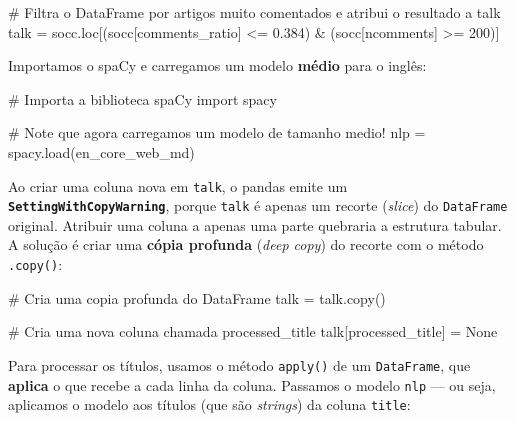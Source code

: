 \documentclass[
  brazilian,
  11pt,
]{article}
\newenvironment{Shaded}{\begin{snugshade}}{\end{snugshade}}
\newcommand{\CommentTok}[1]{\textcolor[rgb]{0.48,0.49,0.49}{#1}}
\newcommand{\DecValTok}[1]{\textcolor[rgb]{0.96,0.45,0.00}{#1}}
\newcommand{\FloatTok}[1]{\textcolor[rgb]{0.96,0.45,0.00}{#1}}
\newcommand{\ImportTok}[1]{\textcolor[rgb]{0.15,0.68,0.38}{#1}}
\newcommand{\NormalTok}[1]{\textcolor[rgb]{0.81,0.81,0.76}{#1}}
\newcommand{\OperatorTok}[1]{\textcolor[rgb]{0.81,0.81,0.76}{#1}}
\newcommand{\StringTok}[1]{\textcolor[rgb]{0.96,0.31,0.31}{#1}}
\newcommand{\VariableTok}[1]{\textcolor[rgb]{0.15,0.68,0.68}{#1}}
\let\oldtexttt\texttt
\renewcommand{\texttt}[1]{{\color{inlink}\oldtexttt{#1}}}
\begin{document}
\begin{Shaded}
\begin{Highlighting}[]
\CommentTok{\# Filtra o DataFrame por artigos muito comentados e atribui o resultado a \textquotesingle{}talk\textquotesingle{}}
\NormalTok{talk }\OperatorTok{=}\NormalTok{ socc.loc[(socc[}\StringTok{\textquotesingle{}comments\_ratio\textquotesingle{}}\NormalTok{] }\OperatorTok{\textless{}=} \FloatTok{0.384}\NormalTok{) }\OperatorTok{\&}\NormalTok{ (socc[}\StringTok{\textquotesingle{}ncomments\textquotesingle{}}\NormalTok{] }\OperatorTok{\textgreater{}=} \DecValTok{200}\NormalTok{)]}
\end{Highlighting}
\end{Shaded}

Importamos o spaCy e carregamos um modelo \textbf{médio} para o inglês:

\begin{Shaded}
\begin{Highlighting}[]
\CommentTok{\# Importa a biblioteca spaCy}
\ImportTok{import}\NormalTok{ spacy}

\CommentTok{\# Note que agora carregamos um modelo de tamanho medio!}
\NormalTok{nlp }\OperatorTok{=}\NormalTok{ spacy.load(}\StringTok{\textquotesingle{}en\_core\_web\_md\textquotesingle{}}\NormalTok{)}
\end{Highlighting}
\end{Shaded}

Ao criar uma coluna nova em \texttt{talk}, o pandas emite um
\textbf{\texttt{SettingWithCopyWarning}}, porque \texttt{talk} é apenas
um recorte (\emph{slice}) do \texttt{DataFrame} original. Atribuir uma
coluna a apenas uma parte quebraria a estrutura tabular. A solução é
criar uma \textbf{cópia profunda} (\emph{deep copy}) do recorte com o
método \texttt{.copy()}:

\begin{Shaded}
\begin{Highlighting}[]
\CommentTok{\# Cria uma copia profunda do DataFrame}
\NormalTok{talk }\OperatorTok{=}\NormalTok{ talk.copy()}

\CommentTok{\# Cria uma nova coluna chamada \textquotesingle{}processed\_title\textquotesingle{}}
\NormalTok{talk[}\StringTok{\textquotesingle{}processed\_title\textquotesingle{}}\NormalTok{] }\OperatorTok{=} \VariableTok{None}
\end{Highlighting}
\end{Shaded}

Para processar os títulos, usamos o método \texttt{apply()} de um
\texttt{DataFrame}, que \textbf{aplica} o que recebe a cada linha da
coluna. Passamos o modelo \texttt{nlp} --- ou seja, aplicamos o modelo
aos títulos (que são \emph{strings}) da coluna \texttt{title}:
\end{document}
